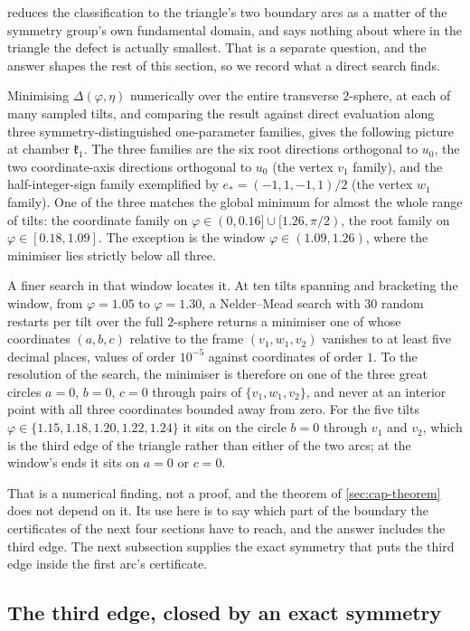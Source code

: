 \documentclass[11pt,reqno]{amsart}
\renewcommand{\_}{\origunderscore\allowbreak}
\numberwithin{equation}{section}
\theoremstyle{plain}
\theoremstyle{definition}
\theoremstyle{remark}
\newcommand{\Cell}[1]{\mathfrak{k}_{#1}}     %
\newcommand{\tilt}{\varphi}                  %
\newcommand{\dev}{\eta}                      %
\newcommand{\defect}{\Delta}                 %
\newcommand{\base}{u}                        %
\begin{document}
 reduces the classification to the
triangle's two boundary arcs as a matter of the symmetry group's own
fundamental domain, and says nothing about where in the triangle the
defect is actually smallest. That is a separate question, and the answer
shapes the rest of this section, so we record what a direct search
finds.

Minimising $\defect(\tilt,\dev)$ numerically over the entire transverse
$2$-sphere, at each of many sampled tilts, and comparing the result
against direct evaluation along three symmetry-distinguished
one-parameter families, gives the following picture at chamber
$\Cell1$. The three families are the six root directions orthogonal to
$\base_0$, the two coordinate-axis directions orthogonal to $\base_0$
(the vertex $v_1$ family), and the half-integer-sign family exemplified
by $e_*=(-1,1,-1,1)/2$ (the vertex $w_1$ family). One of the three
matches the global minimum for almost the whole range of tilts: the
coordinate family on $\tilt\in(0,0.16]\cup[1.26,\pi/2)$, the root
family on $\tilt\in[0.18,1.09]$. The exception is the window
$\tilt\in(1.09,1.26)$, where the minimiser lies strictly below all
three.

A finer search in that window locates it. At ten tilts spanning and
bracketing the window, from $\tilt=1.05$ to $\tilt=1.30$, a
Nelder--Mead search with $30$ random restarts per tilt over the full
$2$-sphere returns a minimiser one of whose coordinates $(a,b,c)$
relative to the frame $(v_1,w_1,v_2)$ vanishes to at least five decimal
places, values of order $10^{-5}$ against coordinates of order $1$. To
the resolution of the search, the minimiser is therefore on one of the
three great circles $a=0$, $b=0$, $c=0$ through pairs of
$\{v_1,w_1,v_2\}$, and never at an interior point with all three
coordinates bounded away from zero. For the five tilts
$\tilt\in\{1.15,1.18,1.20,1.22,1.24\}$ it sits on the circle $b=0$
through $v_1$ and $v_2$, which is the third edge of the triangle rather
than either of the two arcs; at the window's ends it sits on $a=0$ or
$c=0$.

That is a numerical finding, not a proof, and the theorem of
\cref{sec:cap-theorem} does not depend on it. Its use here is to say
which part of the boundary the certificates of the next four sections
have to reach, and the answer includes the third edge. The next
subsection supplies the exact symmetry that puts the third edge inside
the first arc's certificate.

\subsection{The third edge, closed by an exact symmetry}\label{sec:third-edge-closed}
\end{document}
